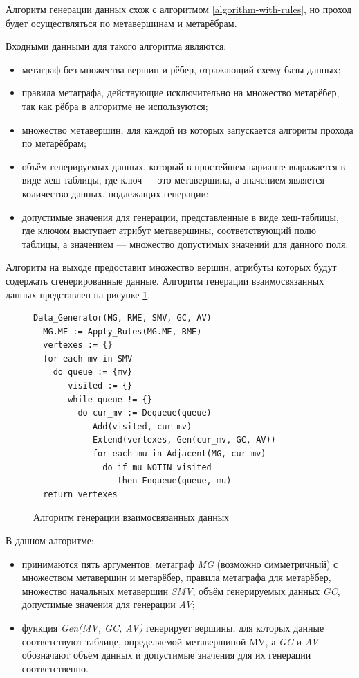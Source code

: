 Алгоритм генерации данных схож с алгоритмом \ref{algorithm-with-rules}, но проход будет осуществляться по метавершинам и метарёбрам.

Входными данными для такого алгоритма являются:
\begin{itemize}
  \item метаграф без множества вершин и рёбер, отражающий схему базы данных;
  \item правила метаграфа, действующие исключительно на множество метарёбер, так как рёбра в алгоритме не используются;
  \item множество метавершин, для каждой из которых запускается алгоритм прохода по метарёбрам;
  \item объём генерируемых данных, который в простейшем варианте выражается в виде хеш-таблицы, где ключ — это метавершина, а значением является количество данных, подлежащих генерации;
  \item допустимые значения для генерации, представленные в виде хеш-таблицы, где ключом выступает атрибут метавершины, соответствующий полю таблицы, а значением — множество допустимых значений для данного поля.
\end{itemize}

Алгоритм на выходе предоставит множество вершин, атрибуты которых будут содержать сгенерированные данные. Алгоритм генерации взаимосвязанных данных представлен на рисунке \ref{algorithm-data-gen}.

\begin{figure}
  \begin{lstlisting}
Data_Generator(MG, RME, SMV, GC, AV)
  MG.ME := Apply_Rules(MG.ME, RME)
  vertexes := {}
  for each mv in SMV
    do queue := {mv}
       visited := {}
       while queue != {}
         do cur_mv := Dequeue(queue)
            Add(visited, cur_mv)
            Extend(vertexes, Gen(cur_mv, GC, AV))
            for each mu in Adjacent(MG, cur_mv)
              do if mu NOTIN visited
                 then Enqueue(queue, mu)
  return vertexes
  \end{lstlisting}
  \caption{Алгоритм генерации взаимосвязанных данных}
  \label{algorithm-data-gen}
\end{figure}

В данном алгоритме:
\begin{itemize}
  \item принимаются пять аргументов: метаграф \textit{MG} (возможно симметричный) с множеством метавершин и метарёбер, правила метаграфа для метарёбер, множество начальных метавершин \textit{SMV}, объём генерируемых данных \textit{GC}, допустимые значения для генерации \textit{AV};
  \item функция \textit{Gen(MV, GC, AV)} генерирует вершины, для которых данные соответствуют таблице, определяемой метавершиной MV, а \textit{GC} и \textit{AV} обозначают объём данных и допустимые значения для их генерации соответственно.
\end{itemize}

